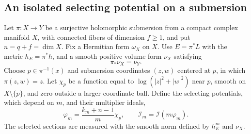 \subsection{An isolated selecting potential on a submersion}
Let $\pi\colon X\to Y$ be a surjective holomorphic submersion from a compact complex manifold $X$, with connected fibers of dimension $f\geq1$, and put $n=q+f=\dim X$. Fix a Hermitian form $\omega_X$ on $X$. Use $E=\pi^*L$ with the metric $h_E=\pi^*h$, and a smooth positive volume form $\nu_X$ satisfying
\begin{equation}\label{eq:anisotropic-matched-volume}
 \pi_*\nu_X=\nu_Y.
\end{equation}
Choose $p\in\pi^{-1}(x)$ and submersion coordinates $(z,w)$ centered at $p$, in which $\pi(z,w)=z$. Let $\chi_p$ be a function equal to $\log(|z|^2+|w|^2)$ near $p$, smooth on $X\setminus\{p\}$, and zero outside a larger coordinate ball. Define the selecting potentials, which depend on $m$, and their multiplier ideals,
\[
 \varphi_m=\frac{k_m+n-1}{m}\chi_p,\qquad
 \mathcal I_m=\mathcal I(m\varphi_m).
\]
The selected sections are measured with the smooth norm defined by $h_E^m$ and $\nu_X$.

